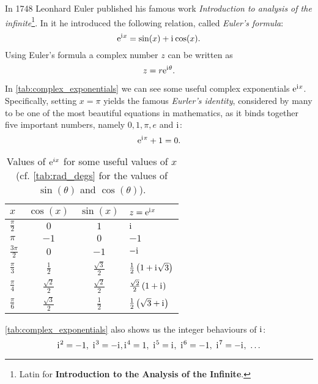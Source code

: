 In 1748 Leonhard Euler published his famous work \textit{Introduction to analysis of the infinite}\footnote{Latin for \textbf{Introduction to the Analysis of the Infinite}.}. In it he introduced the following relation, called \emph{Euler's formula}:
\begin{equation}
	\mathrm{e}^{\mathrm{i}\mkern1mu x} = \sin(x) + \mathrm{i}\mkern1mu\cos(x).
	\label{eq:Euler's_formula}
\end{equation}
Using Euler's formula a complex number $z$ can be written as
\begin{equation}
	z = r\mathrm{e}^{\mathrm{i}\mkern1mu\theta}.
	\label{eq:complex number using Eurler's formula}
\end{equation}

In \autoref{tab:complex_exponentials} we can see some useful complex exponentials $\mathrm{e}^{\mathrm{i}\mkern1mu x}$. Specifically, setting $x=\pi$ yields the famous \emph{Eurler's identity}, considered by many to be one of the most beautiful equations in mathematics, as it binds together five important numbers, namely $0,1,\pi,e$ and $\mathrm{i}\mkern1mu$:
\begin{equation}
	\mathrm{e}^{\mathrm{i}\mkern1mu\pi} + 1 = 0.
	\label{eq:Euler's identity}
\end{equation}

\begin{table}
	\centering
	\caption{Values of $\mathrm{e}^{ix}$ for some useful values of $x$ (cf. \autoref{tab:rad_degs} for the values of $\sin(\theta)$ and $\cos(\theta)$).}
	\label{tab:complex_exponentials}
	\begin{tabular}{lccl}
		\toprule
		$x$ & $\cos(x)$ & $\sin(x)$ & $z=\mathrm{e}^{\mathrm{i}\mkern1mu x}$\\
		\midrule
		$\frac{\pi}{2}$ & $0$ & $1$ & $\mathrm{i}\mkern1mu$\\
		$\pi$ & $-1$ & $0$ & $-1$\\
		$\frac{3\pi}{2}$ & $0$ & $-1$ & $-\mathrm{i}\mkern1mu$\\
		$\frac{\pi}{3}$ & $\frac{1}{2}$ & $\frac{\sqrt{3}}{2}$ & $\frac{1}{2}\left( 1+\mathrm{i}\mkern1mu\sqrt{3} \right)$\\
		$\frac{\pi}{4}$ & $\frac{\sqrt{2}}{2}$ & $\frac{\sqrt{2}}{2}$ & $\frac{\sqrt{2}}{2}\left( 1+\mathrm{i}\mkern1mu \right)$\\
		$\frac{\pi}{6}$ & $\frac{\sqrt{3}}{2}$ & $\frac{1}{2}$ & $\frac{1}{2}\left( \sqrt{3}+\mathrm{i}\mkern1mu \right)$\\
		\bottomrule
	\end{tabular}
\end{table}

\autoref{tab:complex_exponentials} also shows us the integer behaviours of $\mathrm{i}\mkern1mu$:
\begin{equation}
	\iu^{2}=-1,\ \iu^{3}=-\iu, \iu^{4}=1,\ \iu^{5}=\iu,\ \iu^{6}=-1,\ \iu^{7}=-\iu,\ \dots
	\label{eq:powers of i}
\end{equation}

